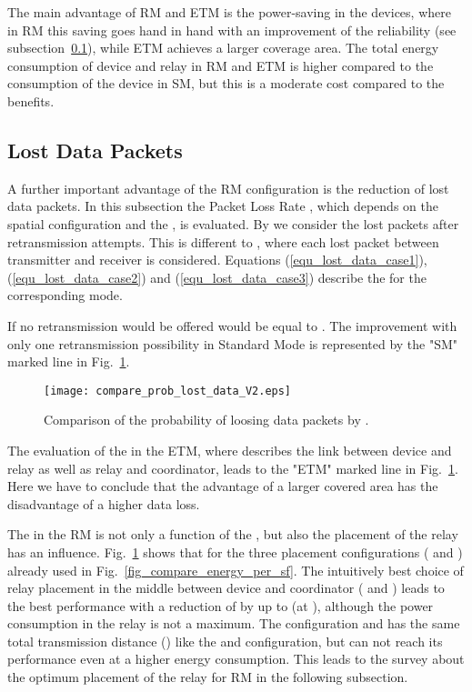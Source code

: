 \documentclass[times,10pt,twocolumn]{article}
\begin{document}
The main advantage of RM and ETM is the power-saving in the devices, where in RM this saving goes hand in hand with an improvement of the reliability (see subsection~\ref{subsection_compare_lost_data}), while ETM achieves a larger coverage area. The total energy consumption of device and relay in RM and ETM is higher compared to the consumption of the device in SM, but this is a moderate cost compared to the benefits.

\subsection{Lost Data Packets}
\label{subsection_compare_lost_data}
A further important advantage of the RM configuration is the reduction of lost data packets. In this subsection the Packet Loss Rate , which depends on the spatial configuration and the , is evaluated. By  we consider the lost packets after retransmission attempts. This is different to , where each lost packet between transmitter and receiver is considered. Equations (\ref{equ_lost_data_case1}), (\ref{equ_lost_data_case2}) and (\ref{equ_lost_data_case3}) describe the  for the corresponding mode.

If no retransmission would be offered  would be equal to . The improvement with only one retransmission possibility in Standard Mode is represented by the "SM" marked line in Fig.~\ref{fig_compare_prob_lost_data}.

\begin{figure}[!h]
\centering
\texttt{[image: compare\_prob\_lost\_data\_V2.eps]}
\caption{Comparison of the probability of loosing data packets by .}
    \label{fig_compare_prob_lost_data}
\end{figure}


The evaluation of the  in the ETM, where  describes the link between device and relay as well as relay and coordinator, leads to the "ETM" marked line in Fig.~\ref{fig_compare_prob_lost_data}. Here we have to conclude that the advantage of a larger covered area has the disadvantage of a higher data loss.

The  in the RM is not only a function of the , but also the placement of the relay has an influence. Fig.~\ref{fig_compare_prob_lost_data} shows that for the three placement configurations ( and ) already used in Fig.~\ref{fig_compare_energy_per_sf}. The intuitively best choice of relay placement in the middle between device and coordinator ( and ) leads to the best performance with a reduction of  by up to  (at  ), although the power consumption in the relay is not a maximum. The configuration  and  has the same total transmission distance () like the  and  configuration, but can not reach its performance even at a higher energy consumption. This leads to the survey about the optimum placement of the relay for RM in the following subsection.
\end{document}
